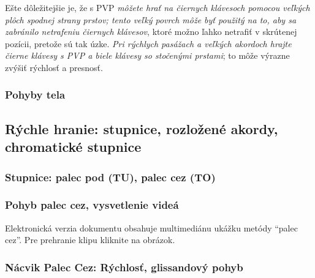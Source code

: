 Ešte dôležitejšie je, že s PVP \emph{môžete hrať na čiernych klávesoch pomocou veľkých plôch spodnej strany prstov; tento veľký povrch môže byť použitý na to, aby sa zabránilo netrafeniu čiernych klávesov}, ktoré možno ľahko netrafiť v skrútenej pozícii, pretože sú tak úzke. \emph{Pri rýchlych pasážach a veľkých akordoch hrajte čierne klávesy s PVP a biele klávesy so stočenými prstami}; to môže výrazne zvýšiť rýchlosť a presnosť.

\subsubsection{Pohyby tela}

\subsection{Rýchle hranie: stupnice, rozložené akordy, chromatické stupnice}

\subsubsection{Stupnice: palec pod (TU), palec cez (TO)}

\subsubsection{Pohyb palec cez, vysvetlenie videá}

Elektronická verzia dokumentu obsahuje multimediánu ukážku metódy “palec cez”. Pre prehranie klipu kliknite na obrázok.
\begin{center}
\end{center}

\subsubsection{Nácvik Palec Cez: Rýchlosť, glissandový pohyb}

